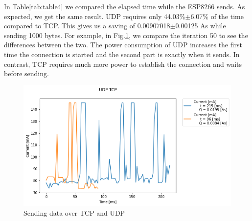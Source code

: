 \linebreak
In Table\ref{tab:table4} we compared the elapsed time while the ESP8266 sends.
As expected, we get the same result.
UDP requires only 44.03\%$\pm$6.07\% of the time compared to TCP.
This gives us a saving of 0.00907018$\pm$0.00125 As while sending 1000 bytes.
\linebreak\linebreak
For example, in Fig.\ref{fig:udp_tcp_s_m},
we compare the iteration 50 to see the differences between the two.
The power consumption of UDP increases the first time the connection
is started and the second part is exactly when it sends.
In contrast, TCP requires much more power to establish the connection and waits before sending.
\linebreak
\begin{figure}[h]
    \centering
    \includegraphics[width = 1 \linewidth]{fig/udp_tcp/udp_tcp_s_m.png}
    \caption{Sending data over TCP and UDP}
    \label{fig:udp_tcp_s_m}
    \end{figure}